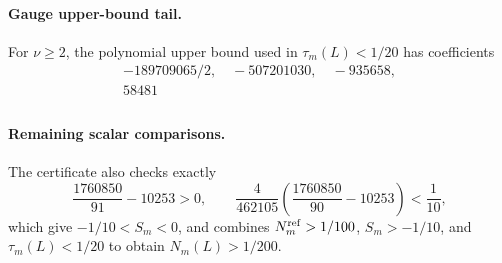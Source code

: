 \paragraph{Gauge upper-bound tail.} For $\nu\ge2$, the polynomial upper bound used in $\tau_m(L)<1/20$ has coefficients
\[
\begin{gathered}
-189709065/2,\quad -507201030,\quad -935658,\\
58481\\
\end{gathered}
\]

\paragraph{Remaining scalar comparisons.}
The certificate also checks exactly
\[
 \frac{1760850}{91}-10253>0,
 \qquad
 \frac4{462105}\left(\frac{1760850}{90}-10253\right)<\frac1{10},
\]
which give $-1/10<S_m<0$, and combines
$N_m^{\rm ref}>1/100$, $S_m>-1/10$, and
$\tau_m(L)<1/20$ to obtain $N_m(L)>1/200$.
